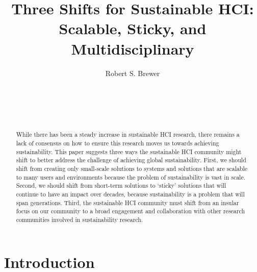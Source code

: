 \documentclass{sigchi}
\begin{document}
\title{Three Shifts for Sustainable HCI: \\ Scalable, Sticky, and Multidisciplinary}

\author{
  \alignauthor Robert S. Brewer\\
    \\
    \\
    \\
    \\
}

\maketitle

\begin{abstract}
While there has been a steady increase in sustainable HCI research, there remains a lack of consensus on how to ensure this research moves us towards achieving sustainability. This paper suggests three ways the sustainable HCI community might shift to better address the challenge of achieving global sustainability. First, we should shift from creating only small-scale solutions to systems and solutions that are scalable to many users and environments because the problem of sustainability is vast in scale. Second, we should shift from short-term solutions to `sticky' solutions that will continue to have an impact over decades, because sustainability is a problem that will span generations. Third, the sustainable HCI community must shift from an insular focus on our community to a broad engagement and collaboration with other research communities involved in sustainability research.
\end{abstract}



\section{Introduction}
\end{document}
